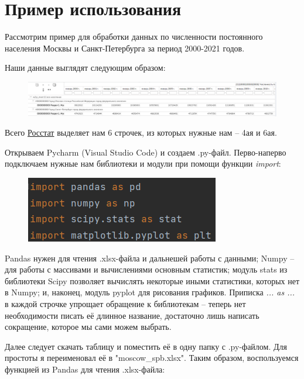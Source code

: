 \section{Пример использования}

Рассмотрим пример для обработки данных по численности постоянного населения Москвы и Санкт-Петербурга за период 2000-2021 годов.

Наши данные выглядят следующим образом:

\begin{figure}[H]
	\begin{center}
		\includegraphics[scale = 0.47]{include/fig/data_rosstat}
	\end{center}
\end{figure}

Всего
\href{https://showdata.gks.ru/finder/descriptors/278928}{Росстат} выделяет нам 6 строчек, из которых нужные нам -- 4ая и 6ая.

Открываем Pycharm (Visual Studio Code) и создаем .py-файл. Перво-наперво подключаем нужные нам библиотеки и модули при помощи функции \textit{import}:

\begin{figure}[H]
	\begin{center}
		\includegraphics{include/fig/import}
	\end{center}
\end{figure}

Pandas нужен для чтения .xlsx-файла и дальнешей работы с данными; Numpy -- для работы с массивами и вычислениями основным статистик; модуль stats из библиотеки Scipy позволяет вычислять некоторые иными статистики, которых нет в Numpy; и, наконец, модуль pyplot для рисования графиков. Приписка \textit{... as ...} в каждой строчке упрощает обращение к библиотекам -- теперь нет необходимости писать её длинное название, достаточно лишь написать сокращение, которое мы сами можем выбрать.

Далее следует скачать таблицу и поместить её в одну папку с .py-файлом. Для простоты я переименовал её в "moscow\_spb.xlsx". Таким образом, воспользуемся функцией из Pandas для чтения .xlsx-файла:

